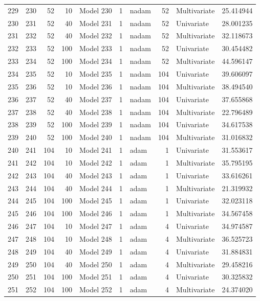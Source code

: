 \begin{tabular}{lrrrlrlrlr}
229 & 230 & 52 & 10 & Model 230 & 1 & nadam & 52 & Multivariate & 25.414944 \\
230 & 231 & 52 & 40 & Model 231 & 1 & nadam & 52 & Univariate & 28.001235 \\
231 & 232 & 52 & 40 & Model 232 & 1 & nadam & 52 & Multivariate & 32.118673 \\
232 & 233 & 52 & 100 & Model 233 & 1 & nadam & 52 & Univariate & 30.454482 \\
233 & 234 & 52 & 100 & Model 234 & 1 & nadam & 52 & Multivariate & 44.596147 \\
234 & 235 & 52 & 10 & Model 235 & 1 & nadam & 104 & Univariate & 39.606097 \\
235 & 236 & 52 & 10 & Model 236 & 1 & nadam & 104 & Multivariate & 38.494540 \\
236 & 237 & 52 & 40 & Model 237 & 1 & nadam & 104 & Univariate & 37.655868 \\
237 & 238 & 52 & 40 & Model 238 & 1 & nadam & 104 & Multivariate & 22.796489 \\
238 & 239 & 52 & 100 & Model 239 & 1 & nadam & 104 & Univariate & 34.617538 \\
239 & 240 & 52 & 100 & Model 240 & 1 & nadam & 104 & Multivariate & 31.016832 \\
240 & 241 & 104 & 10 & Model 241 & 1 & adam & 1 & Univariate & 31.553617 \\
241 & 242 & 104 & 10 & Model 242 & 1 & adam & 1 & Multivariate & 35.795195 \\
242 & 243 & 104 & 40 & Model 243 & 1 & adam & 1 & Univariate & 33.616261 \\
243 & 244 & 104 & 40 & Model 244 & 1 & adam & 1 & Multivariate & 21.319932 \\
244 & 245 & 104 & 100 & Model 245 & 1 & adam & 1 & Univariate & 32.023118 \\
245 & 246 & 104 & 100 & Model 246 & 1 & adam & 1 & Multivariate & 34.567458 \\
246 & 247 & 104 & 10 & Model 247 & 1 & adam & 4 & Univariate & 34.974587 \\
247 & 248 & 104 & 10 & Model 248 & 1 & adam & 4 & Multivariate & 36.525723 \\
248 & 249 & 104 & 40 & Model 249 & 1 & adam & 4 & Univariate & 31.884831 \\
249 & 250 & 104 & 40 & Model 250 & 1 & adam & 4 & Multivariate & 29.458216 \\
250 & 251 & 104 & 100 & Model 251 & 1 & adam & 4 & Univariate & 30.325832 \\
251 & 252 & 104 & 100 & Model 252 & 1 & adam & 4 & Multivariate & 24.374020 \\

\end{tabular}
